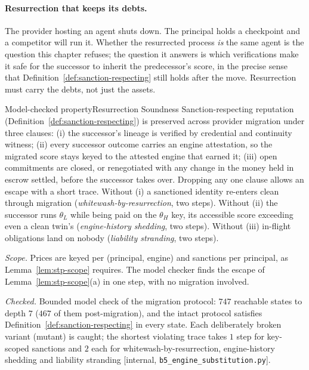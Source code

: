 \documentclass[11pt,a4paper]{article}
\theoremstyle{definition}
\newcounter{protocol}[section]
\begin{document}
\paragraph{Resurrection that keeps its debts.} The provider hosting an agent shuts down.
The principal holds a checkpoint and a competitor will run it. Whether the
resurrected process \emph{is} the same agent is the question this chapter
refuses; the question it answers is which verifications make it safe for the
successor to inherit the predecessor's score, in the precise sense that
Definition~\ref{def:sanction-respecting} still holds after the move.
Resurrection must carry the debts, not just the assets.

\begin{pdclaim}{Model-checked property}{Resurrection Soundness}
\setlength{\parskip}{4pt plus 1pt}
\label{thm:resurrection-soundness}
Sanction-respecting reputation (Definition~\ref{def:sanction-respecting}) is
preserved across provider migration under three clauses: (i) the successor's
lineage is verified by credential and continuity witness; (ii) every
successor outcome carries an engine attestation, so the migrated score stays
keyed to the attested engine that earned it; (iii) open commitments are
closed, or renegotiated with any change in the money held in escrow settled,
before the successor takes over. Dropping any one
clause allows an escape with a short trace. Without (i) a sanctioned identity
re-enters clean through migration (\emph{whitewash-by-resurrection}, two
steps). Without (ii) the successor runs $\theta_L$ while being paid on the
$\theta_H$ key, its accessible score exceeding even a clean twin's
(\emph{engine-history shedding}, two steps). Without (iii) in-flight
obligations land on nobody (\emph{liability stranding}, two steps).

\smallskip\noindent\emph{Scope.} Prices are keyed per (principal, engine)
and sanctions per principal, as Lemma~\ref{lem:stp-scope} requires. The model
checker finds the escape of Lemma~\ref{lem:stp-scope}(a) in one step, with no
migration involved.

\smallskip\noindent\emph{Checked.} Bounded model check of the migration
protocol: $747$ reachable states to depth $7$ ($467$ of them
post-migration), and the intact protocol satisfies
Definition~\ref{def:sanction-respecting} in every state. Each deliberately
broken variant (mutant) is caught; the shortest violating trace takes $1$ step
for key-scoped sanctions and $2$ each for whitewash-by-resurrection,
engine-history shedding and liability stranding [internal,
\texttt{b5\_engine\_substitution.py}].
\end{pdclaim}
\end{document}
